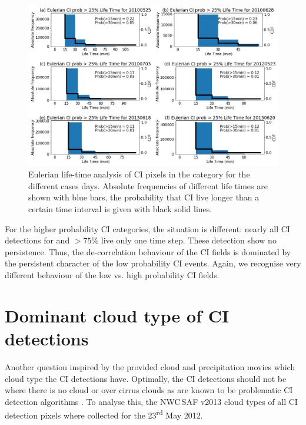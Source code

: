 \begin{figure}
\centering
\includegraphics[width=\textwidth]{Grafiken/Abbildungen/life_time_CI25.jpg}
\caption{Eulerian life-time analysis of CI pixels in the category \annote[JMM]{$>25\%$}{Do you mean $]25,50]$?} for the different cases days.  Absolute frequencies of different life times are shown with blue bars, the probability that CI live longer than a certain time interval is given with black solid lines. }
\label{fig:life-time}
\end{figure}

For the higher probability CI categories, the situation is different: nearly all CI detections for and $>75\%$ live only one time step. These detection show no persistence. Thus, the de-correlation behaviour of the CI fields is dominated by the persistent character of the low probability CI events. Again, we recognise  very different behaviour of the low vs. high probability CI fields.

\section{Dominant cloud type of CI detections}
Another question inspired by the provided cloud and precipitation movies  which cloud type the CI detections have. Optimally, the CI detections should not be  where there is no cloud or over cirrus clouds as  are known to be problematic  CI detection algorithms . To analyse this, the NWC\,SAF v2013 cloud types of all CI detection pixels where collected for the 23\textsuperscript{rd} May 2012. 

